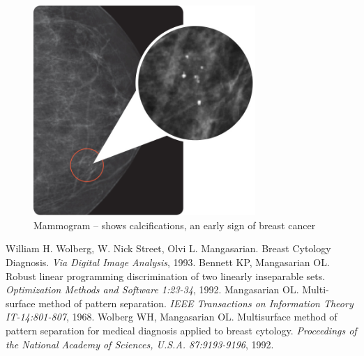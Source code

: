 \begin{figure}[!hbt]
\centering
\includegraphics[width=0.75\textwidth]{calcifications.png}
\caption{\label{fig:frog}Mammogram – shows calcifications, an early sign of breast cancer
}
\end{figure}

\clearpage

\begin{thebibliography}{}
\bibitem{} William H. Wolberg, W. Nick Street, Olvi L. Mangasarian. Breast Cytology Diagnosis. \emph{Via Digital Image Analysis}, 1993.
\bibitem{} Bennett KP, Mangasarian OL. Robust linear programming discrimination of two linearly inseparable sets. \emph{Optimization Methods and Software 1:23-34}, 1992.
\bibitem{} Mangasarian OL. Multi-surface method of pattern separation. \emph{IEEE Transactions on Information Theory IT-14:801-807}, 1968.
\bibitem{} Wolberg WH, Mangasarian OL. Multisurface method of pattern separation for medical diagnosis applied to breast cytology. \emph{Proceedings of the National Academy of Sciences, U.S.A. 87:9193-9196}, 1992.
\end{thebibliography}


